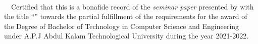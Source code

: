 \begin{flushright}
{\myDate}\\ \bigskip                                  
\end{flushright}

\jadafont
  {~~Certified that this  is a bonafide record of the {\em seminar paper} presented by {\bf  \studentName \space \KTUno } with the title ``{{\sc \large  \myTitle }}'' towards the partial fulfillment of the requirements for the award of the Degree of Bachelor of Technology in Computer Science and Engineering under A.P.J Abdul Kalam Technological University during the year 2021-2022.}
  
\vspace*{3cm}

\begin{table}[h]
	\centering
\end{table}

\vspace*{1cm}
\parskip 8pt
\clearpage  
  

